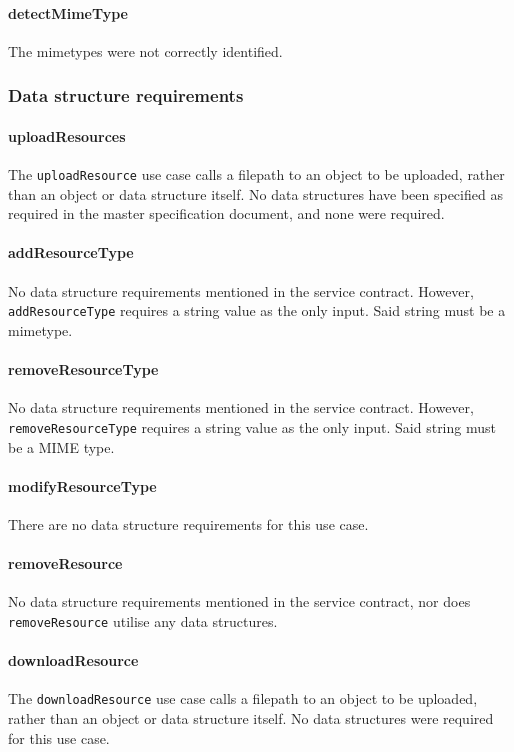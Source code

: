\documentclass[a4paper]{article}
\begin{document}
\paragraph{detectMimeType}
The mimetypes were not correctly identified.

\subsubsection {Data structure requirements}

\paragraph{uploadResources}
The \texttt{uploadResource} use case calls a filepath to an object to be uploaded, rather than an object or data structure itself. No data structures have been specified as required in the master specification document, and none were required.

\paragraph{addResourceType}
No data structure requirements mentioned in the service contract. However, \texttt{addResourceType} requires a string value as the only input. Said string must be a mimetype.

\paragraph{removeResourceType}
No data structure requirements mentioned in the service contract. However, \texttt{removeResourceType} requires a string value as the only input. Said string must be a MIME type.

\paragraph{modifyResourceType}
There are no data structure requirements for this use case.

\paragraph{removeResource}
No data structure requirements mentioned in the service contract, nor does \texttt{removeResource} utilise any data structures.

\paragraph{downloadResource}
The \texttt{downloadResource} use case calls a filepath to an object to be uploaded, rather than an object or data structure itself. No data structures were required for this use case.
\end{document}
